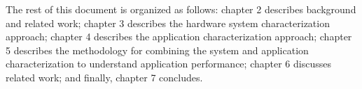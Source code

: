 


The rest of this document is organized as follows:
chapter 2 describes background and related work;
chapter 3 describes the hardware system characterization approach;
chapter 4 describes the application characterization approach;
chapter 5 describes the methodology for combining the system and application characterization to understand application performance;
chapter 6 discusses related work;
and finally, chapter 7 concludes.

